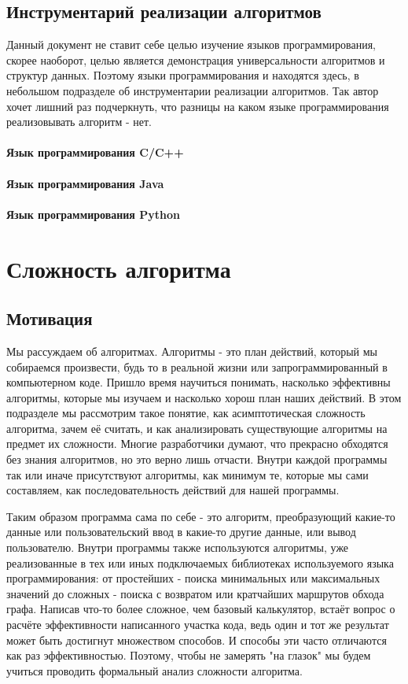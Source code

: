 \documentclass[fontsize=14bp]{report}
\begin{document}
\subsection{Инструментарий реализации алгоритмов}
Данный документ не ставит себе целью изучение языков программирования, скорее наоборот, целью является демонстрация универсальности алгоритмов и структур данных. Поэтому языки программирования и находятся здесь, в небольшом подразделе об инструментарии реализации алгоритмов. Так автор хочет лишний раз подчеркнуть, что разницы на каком языке программирования реализовывать алгоритм - нет.
\paragraph{Язык программирования C/C++}
\paragraph{Язык программирования Java}
\paragraph{Язык программирования Python}
\section{Сложность алгоритма}
\subsection{Мотивация}
Мы рассуждаем об алгоритмах. Алгоритмы - это план действий, который мы собираемся произвести, будь то в реальной жизни или запрограммированный в компьютерном коде. Пришло время научиться понимать, насколько эффективны алгоритмы, которые мы изучаем и насколько хорош план наших действий. В этом подразделе мы рассмотрим такое понятие, как асимптотическая сложность алгоритма, зачем её считать, и как анализировать существующие алгоритмы на предмет их сложности. Многие разработчики думают, что прекрасно обходятся без знания алгоритмов, но это верно лишь отчасти. Внутри каждой программы так или иначе присутствуют алгоритмы, как минимум те, которые мы сами составляем, как последовательность действий для нашей программы.

Таким образом программа сама по себе - это алгоритм, преобразующий какие-то данные или пользовательский ввод в какие-то другие данные, или вывод пользователю. Внутри программы также используются алгоритмы, уже реализованные в тех или иных подключаемых библиотеках используемого языка программирования: от простейших - поиска минимальных или максимальных значений до сложных - поиска с возвратом или кратчайших маршрутов обхода графа. Написав что-то более сложное, чем базовый калькулятор, встаёт вопрос о расчёте эффективности написанного участка кода, ведь один и тот же результат может быть достигнут множеством способов. И способы эти часто отличаются как раз эффективностью. Поэтому, чтобы не замерять "на глазок" мы будем учиться проводить формальный анализ сложности алгоритма.
\end{document}

